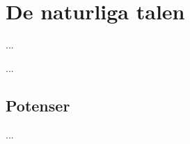 \chapter{De naturliga talen}
\noindent
...

\begin{definition}
	...
\end{definition}


\section{Potenser}
\noindent
...
